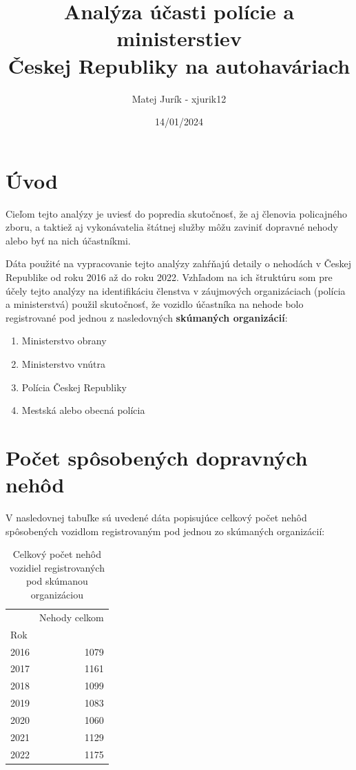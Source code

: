 \documentclass{article}
\title{Analýza účasti polície a ministerstiev \\ Českej Republiky na autohaváriach}
\author{Matej Jurík - xjurik12}
\date{14/01/2024}
\begin{document}
\maketitle

\section{Úvod}\label{sec:uvod}

Cieľom tejto analýzy je uviesť do popredia skutočnosť, že aj členovia policajného zboru, a taktiež
aj vykonávatelia štátnej služby môžu zaviniť dopravné nehody alebo byť na nich účastníkmi.

Dáta použité na vypracovanie tejto analýzy zahŕňajú detaily o nehodách v Českej Republike
od roku 2016 až do roku 2022.
Vzhľadom na ich štruktúru som pre účely tejto analýzy na identifikáciu členstva v záujmových
organizáciach (polícia a ministerstvá)
použil skutočnosť, že vozidlo účastníka na nehode bolo registrované pod jednou z nasledovných
\textbf{skúmaných organizácií}:
\begin{enumerate}
 \item Ministerstvo obrany
 \item Ministerstvo vnútra
 \item Polícia Českej Republiky
 \item Mestská alebo obecná polícia
\end{enumerate}



\section{Počet spôsobených dopravných nehôd}\label{sec:pocet-sposobenych-dopravnych-nehod}

V nasledovnej tabuľke sú uvedené dáta popisujúce celkový počet nehôd spôsobených
vozidlom registrovaným pod jednou zo skúmaných organizácií:

\begin{table}[htb]
\caption{Celkový počet nehôd vozidiel registrovaných pod skúmanou organizáciou}
\begin{center}
\begin{tabular}{lr}
\toprule
 & Nehody celkom \\
Rok &  \\
\midrule
2016 & 1079 \\
2017 & 1161 \\
2018 & 1099 \\
2019 & 1083 \\
2020 & 1060 \\
2021 & 1129 \\
2022 & 1175 \\
\bottomrule
\end{tabular}\label{tab:table1}
\end{center}
\end{table}
\end{document}
